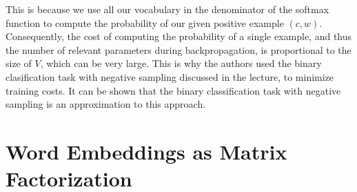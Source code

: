 \documentclass[11pt,a4paper]{article}
\begin{document}
\begin{enumerate}[label=(\alph*)]
          This is because we use all our vocabulary in the denominator of the
          softmax function to compute the probability of our given positive
          example $(c,w)$.
          Consequently, the cost of computing the probability of a single
          example, and thus the number of relevant parameters during
          backpropagation, is proportional to the size of $V$, which can be very
          large.
          This is why the authors used the binary clasification task with
          negative sampling discussed in the lecture, to minimize training
          costs.
          It can be shown that the binary classification task with negative
          sampling is an approximation to this approach.
\end{enumerate}

\section{Word Embeddings as Matrix Factorization}
\end{document}

